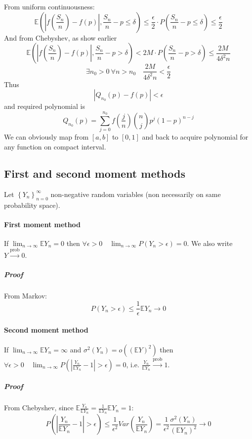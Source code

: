 From uniform continuousness:
$$\mathbb{E} \left(\left|  f\left( \frac{S_n}{n} \right) - f(p) \right|, \frac{S_n}{n} - p \leq \delta \right)  \leq  \frac{\epsilon}{2} \cdot P\left(\frac{S_n}{n} - p \leq \delta \right) \leq \frac{\epsilon}{2} $$
And from Chebyshev, as show earlier
$$\mathbb{E} \left(\left|  f\left( \frac{S_n}{n} \right) - f(p) \right|, \frac{S_n}{n} - p > \delta \right) < 2M \cdot P\left(\frac{S_n}{n} - p > \delta \right)  \leq \frac{2M}{4\delta^2 n} $$
$$\exists n_0 > 0 \: \forall n>n_0  \quad \frac{2M}{4\delta^2 n}  < \frac{\epsilon}{2}$$
Thus
$$|Q_{n_0}(p) - f(p) | < \epsilon$$
and required polynomial is
$$Q_{n_0}(p) = \sum_{j=0}^{n_0} f\left(\frac{j}{n}\right) \binom{n}{j} p^j (1-p)^{n-j} $$
We can obviously map from $[a,b]$ to $[0,1]$ and back to acquire polynomial for any function on compact interval.
\subsection{First and second moment methods}
Let $\left\{ Y_n \right\}_{n=0}^\infty$ non-negative random variables (non necessarily on same probability space).
\paragraph{First moment method}
If $\lim_{n \to \infty} \mathbb{E} Y_n = 0$ then $\forall \epsilon > 0 \quad \lim_{n \to \infty} P(Y_n>\epsilon) = 0$. We also write $Y \stackrel{\text{prob}}{\to} 0$.
\subparagraph{Proof}
From Markov:
$$P(Y_n>\epsilon) \leq \frac{1}{\epsilon} \mathbb{E} Y_n \to 0$$
\paragraph{Second moment method}
If $\lim_{n \to \infty} \mathbb{E} Y_n = \infty$ and $\sigma^2(Y_n) = o\left(\left(\mathbb{E} Y\right)^2\right)$ then $\forall \epsilon > 0 \quad \lim_{n \to \infty} P\left(\left|\frac{Y_n}{\mathbb{E} Y_n} - 1\right|>\epsilon \right) = 0$, i.e. $\frac{Y_n}{\mathbb{E} Y_n} \stackrel{\text{prob}}{\to} 1$.
\subparagraph{Proof}
From Chebyshev, since $\mathbb{E} \frac{Y_n}{\mathbb{E} Y_n}  = \frac{1}{\mathbb{E} Y_n}\mathbb{E} Y_n = 1$:
$$ P\left(\left|\frac{Y_n}{\mathbb{E} Y_n} - 1\right|>\epsilon \right) \leq \frac{1}{\epsilon^2} Var \left( \frac{Y_n}{\mathbb{E} Y_n} \right) = \frac{1}{\epsilon^2}  \frac{\sigma^2(Y_n)}{(\mathbb{E} Y_n)^2} \to 0$$
